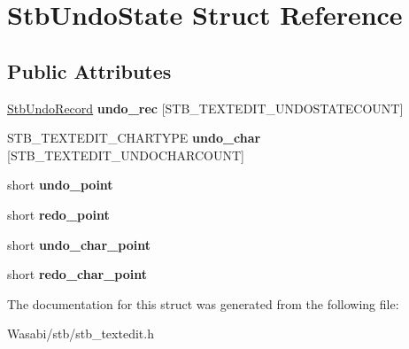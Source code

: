 \hypertarget{struct_stb_undo_state}{}\section{Stb\+Undo\+State Struct Reference}
\label{struct_stb_undo_state}
\subsection*{Public Attributes}
\begin{DoxyCompactItemize}
\item 
\hyperlink{struct_stb_undo_record}{Stb\+Undo\+Record} {\bfseries undo\+\_\+rec} \mbox{[}S\+T\+B\+\_\+\+T\+E\+X\+T\+E\+D\+I\+T\+\_\+\+U\+N\+D\+O\+S\+T\+A\+T\+E\+C\+O\+U\+NT\mbox{]}\hypertarget{struct_stb_undo_state_a8cb07be8f304d1620b50bd024709023f}{}\label{struct_stb_undo_state_a8cb07be8f304d1620b50bd024709023f}

\item 
S\+T\+B\+\_\+\+T\+E\+X\+T\+E\+D\+I\+T\+\_\+\+C\+H\+A\+R\+T\+Y\+PE {\bfseries undo\+\_\+char} \mbox{[}S\+T\+B\+\_\+\+T\+E\+X\+T\+E\+D\+I\+T\+\_\+\+U\+N\+D\+O\+C\+H\+A\+R\+C\+O\+U\+NT\mbox{]}\hypertarget{struct_stb_undo_state_a88320a054aaf18ca122c2b23903a8677}{}\label{struct_stb_undo_state_a88320a054aaf18ca122c2b23903a8677}

\item 
short {\bfseries undo\+\_\+point}\hypertarget{struct_stb_undo_state_ad29a8695b3e8252ac164d0c2d0be7d7c}{}\label{struct_stb_undo_state_ad29a8695b3e8252ac164d0c2d0be7d7c}

\item 
short {\bfseries redo\+\_\+point}\hypertarget{struct_stb_undo_state_a719ba014b2db8a8ea55739664b445af0}{}\label{struct_stb_undo_state_a719ba014b2db8a8ea55739664b445af0}

\item 
short {\bfseries undo\+\_\+char\+\_\+point}\hypertarget{struct_stb_undo_state_ad5c08b1f8c24678c44407f0ca805afcf}{}\label{struct_stb_undo_state_ad5c08b1f8c24678c44407f0ca805afcf}

\item 
short {\bfseries redo\+\_\+char\+\_\+point}\hypertarget{struct_stb_undo_state_a928f655e4af8945a14d99e944441704a}{}\label{struct_stb_undo_state_a928f655e4af8945a14d99e944441704a}

\end{DoxyCompactItemize}


The documentation for this struct was generated from the following file\+:\begin{DoxyCompactItemize}
\item 
Wasabi/stb/stb\+\_\+textedit.\+h\end{DoxyCompactItemize}
